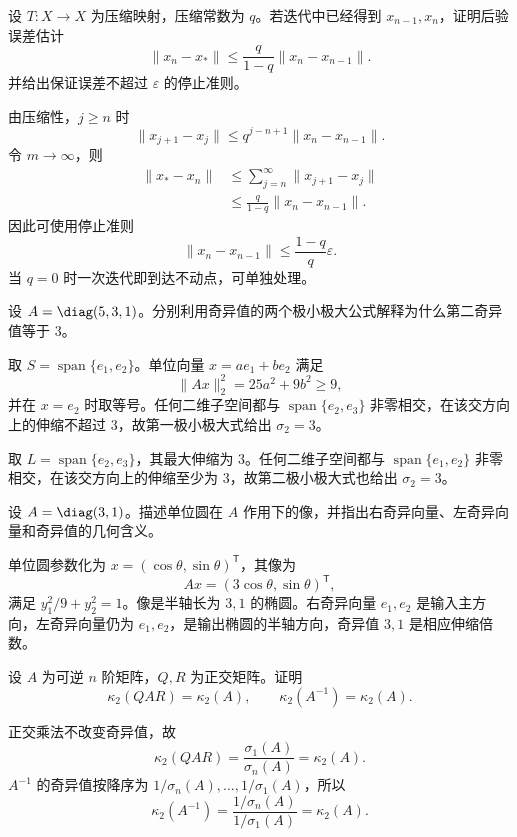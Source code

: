 \begin{exercise}[level=advanced]
设 $T:X\to X$ 为压缩映射，压缩常数为 $q$。若迭代中已经得到 $x_{n-1},x_n$，证明后验误差估计
\[
\lVert x_n-x_*\rVert\le\frac q{1-q}\lVert x_n-x_{n-1}\rVert.
\]
并给出保证误差不超过 $\varepsilon$ 的停止准则。
\begin{solution}
由压缩性，$j\ge n$ 时
\[
\lVert x_{j+1}-x_j\rVert
\le q^{j-n+1}\lVert x_n-x_{n-1}\rVert.
\]
令 $m\to\infty$，则
\begin{align*}
\lVert x_*-x_n\rVert
&\le\sum_{j=n}^{\infty}\lVert x_{j+1}-x_j\rVert\\
&\le\frac q{1-q}\lVert x_n-x_{n-1}\rVert.
\end{align*}
因此可使用停止准则
\[
\lVert x_n-x_{n-1}\rVert\le\frac{1-q}{q}\varepsilon.
\]
当 $q=0$ 时一次迭代即到达不动点，可单独处理。
\end{solution}
\end{exercise}

\begin{exercise}[level=advanced]
设 $A=\diag(5,3,1)$。分别利用奇异值的两个极小极大公式解释为什么第二奇异值等于 $3$。
\begin{solution}
取 $S=\operatorname{span}\{e_1,e_2\}$。单位向量 $x=ae_1+be_2$ 满足
\[
\lVert Ax\rVert_2^2=25a^2+9b^2\ge9,
\]
并在 $x=e_2$ 时取等号。任何二维子空间都与
$\operatorname{span}\{e_2,e_3\}$ 非零相交，在该交方向上的伸缩不超过 $3$，故第一极小极大式给出 $\sigma_2=3$。

取 $L=\operatorname{span}\{e_2,e_3\}$，其最大伸缩为 $3$。任何二维子空间都与
$\operatorname{span}\{e_1,e_2\}$ 非零相交，在该交方向上的伸缩至少为 $3$，故第二极小极大式也给出 $\sigma_2=3$。
\end{solution}
\end{exercise}

\begin{exercise}[level=advanced]
设 $A=\diag(3,1)$。描述单位圆在 $A$ 作用下的像，并指出右奇异向量、左奇异向量和奇异值的几何含义。
\begin{solution}
单位圆参数化为 $x=(\cos\theta,\sin\theta)^{\mathsf T}$，其像为
\[
Ax=(3\cos\theta,\sin\theta)^{\mathsf T},
\]
满足 $y_1^2/9+y_2^2=1$。像是半轴长为 $3,1$ 的椭圆。右奇异向量 $e_1,e_2$ 是输入主方向，左奇异向量仍为 $e_1,e_2$，是输出椭圆的半轴方向，奇异值 $3,1$ 是相应伸缩倍数。
\end{solution}
\end{exercise}

\begin{exercise}[level=advanced]
设 $A$ 为可逆 $n$ 阶矩阵，$Q,R$ 为正交矩阵。证明
\[
\kappa_2(QAR)=\kappa_2(A),
\qquad
\kappa_2(A^{-1})=\kappa_2(A).
\]
\begin{solution}
正交乘法不改变奇异值，故
\[
\kappa_2(QAR)=\frac{\sigma_1(A)}{\sigma_n(A)}=\kappa_2(A).
\]
$A^{-1}$ 的奇异值按降序为
$1/\sigma_n(A),\ldots,1/\sigma_1(A)$，所以
\[
\kappa_2(A^{-1})
=\frac{1/\sigma_n(A)}{1/\sigma_1(A)}
=\kappa_2(A).
\]
\end{solution}
\end{exercise}

